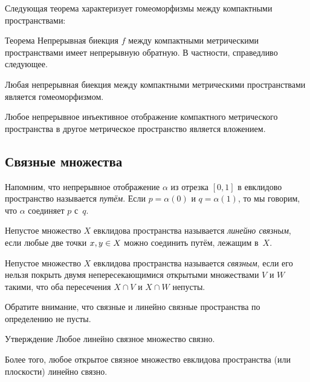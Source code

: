 {{}

Следующая теорема характеризует гомеоморфизмы между компактными пространствами:

\begin{thm}{Теорема}\label{thm:Hausdorff-compact}
Непрерывная биекция $f$ между компактными метрическими пространствами имеет непрерывную обратную.
В частности, справедливо следующее.

\begin{subthm}{}
Любая непрерывная биекция между компактными метрическими пространствами
является гомеоморфизмом.
\end{subthm}

{\sloppy

\begin{subthm}{}
Любое непрерывное инъективное отображение компактного метрического пространства в другое метрическое пространство
является вложением.
\end{subthm}

}

\end{thm}

\subsection*{Связные множества}

Напомним, что непрерывное отображение $\alpha$ из отрезка $[0,1]$ в евклидово пространство называется \emph{путём}.
Если $p=\alpha (0)$ и $q = \alpha (1)$, то мы говорим, что $\alpha$ соединяет $p$ с~$q$.

Непустое множество $X$ евклидова пространства называется \emph{линейно связным}, если любые две точки $x,y\z\in X$ можно соединить путём, лежащим в~$X$.

Непустое множество $X$ евклидова пространства называется \emph{связным}, если его нельзя покрыть двумя непересекающимися открытыми множествами $V$ и $W$ такими, что оба пересечения $X\cap V$ и $X\cap W$ непусты.

Обратите внимание, что связные и линейно связные пространства по определению не пусты. 

\begin{thm}{Утверждение}
Любое линейно связное множество связно.

Более того, любое открытое связное множество евклидова пространства (или плоскости) линейно связно.
\end{thm}

}
